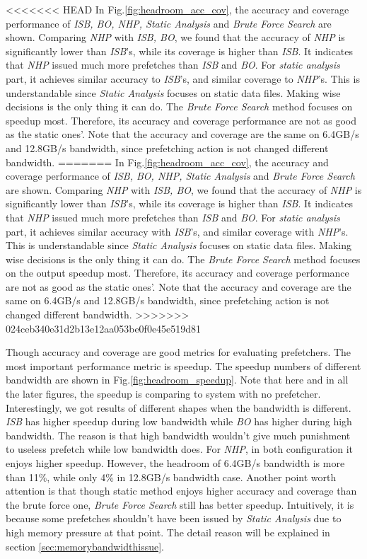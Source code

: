 <<<<<<< HEAD
  In Fig.\ref{fig:headroom_acc_cov}, the accuracy and coverage performance of \emph{ISB, BO, NHP, Static Analysis} and \emph{Brute Force Search} are shown. Comparing \emph{NHP} with \emph{ISB, BO}, we found that the accuracy of \emph{NHP} is significantly lower than \emph{ISB}'s, while its coverage is higher than \emph{ISB}. It indicates that \emph{NHP} issued much more prefetches than \emph{ISB} and \emph{BO}. For \emph{static analysis} part, it achieves similar accuracy to \emph{ISB}'s, and similar coverage to \emph{NHP}'s. This is understandable since \emph{Static Analysis} focuses on static data files. Making wise decisions is the only thing it can do. The \emph{Brute Force Search} method focuses on speedup most. Therefore, its accuracy and coverage performance are not as good as the static ones'. Note that the accuracy and coverage are the same on 6.4GB/s and 12.8GB/s bandwidth, since prefetching action is not changed different bandwidth.
=======
  In Fig.\ref{fig:headroom_acc_cov}, the accuracy and coverage performance of \emph{ISB, BO, NHP, Static Analysis} and \emph{Brute Force Search} are shown. Comparing \emph{NHP} with \emph{ISB, BO}, we found that the accuracy of \emph{NHP} is significantly lower than \emph{ISB}'s, while its coverage is higher than \emph{ISB}. It indicates that \emph{NHP} issued much more prefetches than \emph{ISB} and \emph{BO}. For \emph{static analysis} part, it achieves similar accuracy with \emph{ISB}'s, and similar coverage with \emph{NHP}'s. This is understandable since \emph{Static Analysis} focuses on static data files. Making wise decisions is the only thing it can do. The \emph{Brute Force Search} method focuses on the output speedup most. Therefore, its accuracy and coverage performance are not as good as the static ones'. Note that the accuracy and coverage are the same on 6.4GB/s and 12.8GB/s bandwidth, since prefetching action is not changed different bandwidth.
>>>>>>> 024ceb340e31d2b13e12aa053be0f0e45e519d81

  Though accuracy and coverage are good metrics for evaluating prefetchers. The most important performance metric is speedup. The speedup numbers of different bandwidth are shown in Fig.\ref{fig:headroom_speedup}. Note that here and in all the later figures, the speedup is comparing to system with no prefetcher. Interestingly, we got results of different shapes when the bandwidth is different. \emph{ISB} has higher speedup during low bandwidth while \emph{BO} has higher during high bandwidth. The reason is that high bandwidth wouldn't give much punishment to useless prefetch while low bandwidth does. For \emph{NHP}, in both configuration it enjoys higher speedup. However, the headroom of 6.4GB/s bandwidth is more than 11\%, while only 4\% in 12.8GB/s bandwidth case. Another point worth attention is that though static method enjoys higher accuracy and coverage than the brute force one, \emph{Brute Force Search} still has better speedup. Intuitively, it is because some prefetches shouldn't have been issued by \emph{Static Analysis} due to high memory pressure at that point. The detail reason will be explained in section \ref{sec:memorybandwidthissue}.

